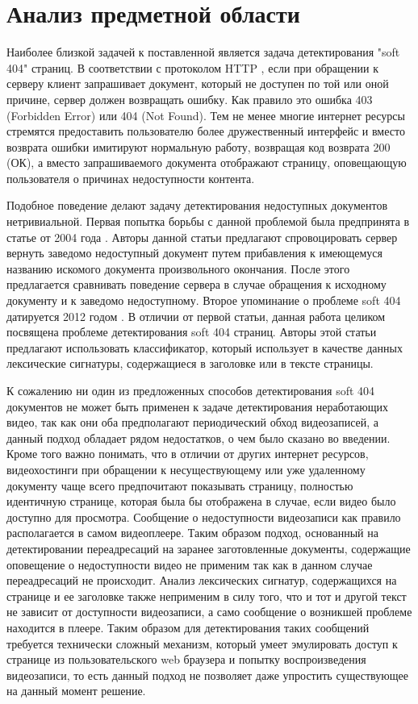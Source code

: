 \chapter{Анализ предметной области}

Наиболее близкой задачей к поставленной является задача детектирования "soft 404" страниц. В соответствии с протоколом HTTP \cite{Fielding2014}, если при обращении к серверу клиент запрашивает документ, который не доступен по той или оной причине, сервер должен возвращать ошибку. Как правило это ошибка 403 (Forbidden Error) или 404 (Not Found). Тем не менее многие интернет ресурсы стремятся предоставить пользователю более дружественный интерфейс и вместо возврата ошибки имитируют нормальную работу, возвращая код возврата 200 (ОК), а вместо запрашиваемого документа отображают страницу, оповещающую пользователя о причинах недоступности контента.

Подобное поведение делают задачу детектирования недоступных документов нетривиальной. Первая попытка борьбы с данной проблемой была предпринята в статье от 2004 года \cite{Bar-Yossef2004}. Авторы данной статьи предлагают спровоцировать сервер вернуть заведомо недоступный документ путем прибавления к имеющемуся названию искомого документа произвольного окончания. После этого предлагается сравнивать поведение сервера в случае обращения к исходному документу и к заведомо недоступному. Второе упоминание о проблеме soft 404 датируется 2012 годом \cite{Meneses2012}. В отличии от первой статьи, данная работа целиком посвящена проблеме детектирования soft 404 страниц. Авторы этой статьи предлагают использовать классификатор, который использует в качестве данных лексические сигнатуры, содержащиеся в заголовке или в тексте страницы.

К сожалению ни один из предложенных способов детектирования soft 404 документов не может быть применен к задаче детектирования неработающих видео, так как они оба предполагают периодический обход видеозаписей, а данный подход обладает рядом недостатков, о чем было сказано во введении. Кроме того важно понимать, что в отличии от других интернет ресурсов, видеохостинги при обращении к несуществующему или уже удаленному документу чаще всего предпочитают показывать страницу, полностью идентичную странице, которая была бы отображена в случае, если видео было доступно для просмотра. Сообщение о недоступности видеозаписи как правило располагается в самом видеоплеере. Таким образом подход, основанный на детектировании переадресаций на заранее заготовленные документы, содержащие оповещение о недоступности видео не применим так как в данном случае переадресаций не происходит. Анализ лексических сигнатур, содержащихся на странице и ее заголовке также неприменим в силу того, что и тот и другой текст не зависит от доступности видеозаписи, а само сообщение о возникшей проблеме находится в плеере. Таким образом для детектирования таких сообщений требуется технически сложный механизм, который умеет эмулировать доступ к странице из пользовательского web браузера и попытку воспроизведения видеозаписи, то есть данный подход не позволяет даже упростить существующее на данный момент решение.